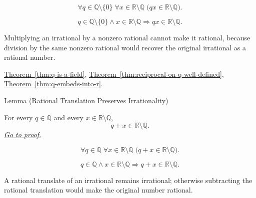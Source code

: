 \begin{remark*}
\[
\forall q\in\mathbb{Q}\setminus\{0\}\;\forall x\in\mathbb{R}\setminus\mathbb{Q}\;
\bigl(qx\in\mathbb{R}\setminus\mathbb{Q}\bigr).
\]
\end{remark*}

\begin{remark*}
\[
q\in\mathbb{Q}\setminus\{0\}\land x\in\mathbb{R}\setminus\mathbb{Q}
\Longrightarrow qx\in\mathbb{R}\setminus\mathbb{Q}.
\]
\end{remark*}

\begin{remark*}[Interpretation]
Multiplying an irrational by a nonzero rational cannot make it rational,
because division by the same nonzero rational would recover the original
irrational as a rational number.
\end{remark*}

\begin{dependencies}
\hyperref[thm:q-is-a-field]{Theorem~\ref*{thm:q-is-a-field}},
\hyperref[thm:reciprocal-on-q-well-defined]{Theorem~\ref*{thm:reciprocal-on-q-well-defined}},
\hyperref[thm:q-embeds-into-r]{Theorem~\ref*{thm:q-embeds-into-r}}.
\end{dependencies}

\begin{lemmabox}{Lemma (Rational Translation Preserves Irrationality)}
\begin{lemma}
\label{lem:rational-translation-preserves-irrationality}
For every $q\in\mathbb{Q}$ and every $x\in\mathbb{R}\setminus\mathbb{Q}$,
\[
  q+x\in\mathbb{R}\setminus\mathbb{Q}.
\]
\hyperref[prf:rational-translation-preserves-irrationality]{\textit{Go to proof.}}
\end{lemma}
\end{lemmabox}

\begin{remark*}
\[
\forall q\in\mathbb{Q}\;\forall x\in\mathbb{R}\setminus\mathbb{Q}\;
\bigl(q+x\in\mathbb{R}\setminus\mathbb{Q}\bigr).
\]
\end{remark*}

\begin{remark*}
\[
q\in\mathbb{Q}\land x\in\mathbb{R}\setminus\mathbb{Q}
\Longrightarrow q+x\in\mathbb{R}\setminus\mathbb{Q}.
\]
\end{remark*}

\begin{remark*}[Interpretation]
A rational translate of an irrational remains irrational; otherwise
subtracting the rational translation would make the original number rational.
\end{remark*}

